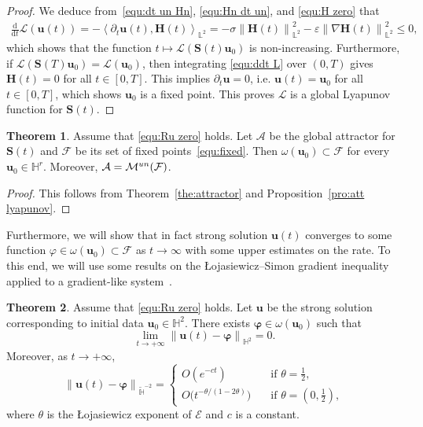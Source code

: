 \documentclass[11pt, reqno]{amsart}
\theoremstyle{definition}
\newtheorem{theorem}{Theorem}[section]
\numberwithin{equation}{section}
\newcommand{\bff}{\boldsymbol}
\newcommand{\bb}{\mathbb}
\newcommand{\ddt}{\frac{\mathrm{d}}{\mathrm{d}t}}
\newcommand{\norm}[2]{\left\|{#1}\right\|_{#2}}
\newcommand{\inpro}[2]{\left\langle#1,#2\right\rangle}
\begin{document}
\begin{proof}
We deduce from~\eqref{equ:dt un Hn}, \eqref{equ:Hn dt un}, and \eqref{equ:H zero} that 
\begin{align}\label{equ:ddt L}
	\ddt \mathcal{L}(\bff{u}(t))
	=
    -\inpro{\partial_t \bff{u}(t)}{\bff{H}(t)}_{\bb{L}^2}
    =
	-
	\sigma \norm{\bff{H}(t)}{\bb{L}^2}^2
	-
	\varepsilon \norm{\nabla \bff{H}(t)}{\bb{L}^2}^2
	\leq 0,
\end{align}
which shows that the function $t\mapsto \mathcal{L}(\bff{S}(t)\bff{u}_0)$ is non-increasing. Furthermore, if $\mathcal{L}(\bff{S}(T)\bff{u}_0)= \mathcal{L}(\bff{u}_0)$, then integrating \eqref{equ:ddt L} over $(0,T)$ gives $\bff{H}(t)=0$ for all $t\in [0,T]$. This implies $\partial_t \bff{u}=0$, i.e. $\bff{u}(t)= \bff{u}_0$ for all~$t\in [0,T]$, which shows $\bff{u}_0$ is a fixed point. This proves $\mathcal{L}$ is a global Lyapunov function for $\bff{S}(t)$.
\end{proof}

\begin{theorem}
Assume that \eqref{equ:Ru zero} holds. Let $\mathcal{A}$ be the global attractor for $\bff{S}(t)$ and $\mathcal{F}$ be its set of fixed points~\eqref{equ:fixed}. Then $\omega(\bff{u}_0) \subset \mathcal{F}$ for every $\bff{u}_0\in \bb{H}^r$. Moreover, $\mathcal{A}= \mathcal{M}^{\rm{un}}(\mathcal{F})$.
\end{theorem}

\begin{proof}
This follows from Theorem~\ref{the:attractor} and Proposition~\ref{pro:att lyapunov}.
\end{proof}

Furthermore, we will show that in fact strong solution $\bff{u}(t)$ converges to some function $\varphi\in \omega(\bff{u}_0) \subset \mathcal{F}$ as $t\to \infty$ with some upper estimates on the rate. To this end, we will use some results on the {\L}ojasiewicz--Simon gradient inequality applied to a gradient-like system~\cite{Chi03, ChiHarJen09}.

\begin{theorem}\label{the:u omega}
Assume that \eqref{equ:Ru zero} holds. Let $\bff{u}$ be the strong solution corresponding to initial data $\bff{u}_0\in\bb{H}^2$.
There exists $\bff{\varphi}\in \omega(\bff{u}_0)$ such that
\[
	\lim_{t\to +\infty} \norm{\bff{u}(t)-\bff{\varphi}}{\bb{H}^2}=0.
\]
Moreover, as $t\to +\infty$,
\begin{equation*}
	\norm{\bff{u}(t)-\bff{\varphi}}{\widetilde{\bb{H}}^{-2}} =
	\begin{cases}
		O(e^{-ct})
		\quad &\text{if $\theta=\frac{1}{2}$},
		\\[1mm]
		O\big(t^{-\theta/(1-2\theta)}\big)
		\quad &\text{if $\theta=(0,\frac{1}{2})$},
	\end{cases}
\end{equation*}
where $\theta$ is the {\L}ojasiewicz exponent of $\mathcal{E}$ and $c$ is a constant.
\end{theorem}
\end{document}
